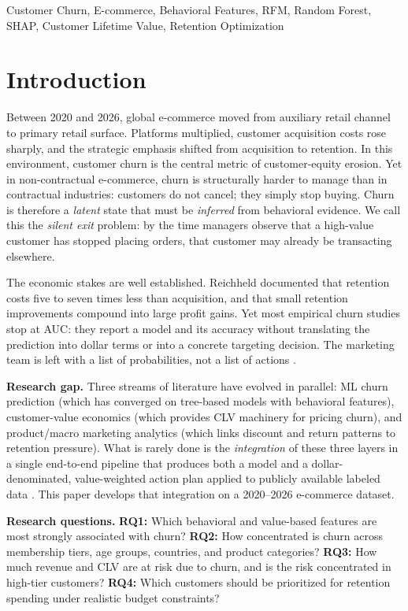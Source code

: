 \documentclass[conference]{IEEEtran}
\begin{document}
\begin{IEEEkeywords}
Customer Churn, E-commerce, Behavioral Features, RFM, Random Forest, SHAP, Customer Lifetime Value, Retention Optimization
\end{IEEEkeywords}

\section{Introduction}

Between 2020 and 2026, global e-commerce moved from auxiliary retail channel to primary retail surface. Platforms multiplied, customer acquisition costs rose sharply, and the strategic emphasis shifted from acquisition to retention. In this environment, customer churn is the central metric of customer-equity erosion. Yet in non-contractual e-commerce, churn is structurally harder to manage than in contractual industries: customers do not cancel; they simply stop buying. Churn is therefore a \emph{latent} state that must be \emph{inferred} from behavioral evidence. We call this the \emph{silent exit} problem: by the time managers observe that a high-value customer has stopped placing orders, that customer may already be transacting elsewhere.

The economic stakes are well established. Reichheld \cite{reichheld2001} documented that retention costs five to seven times less than acquisition, and that small retention improvements compound into large profit gains. Yet most empirical churn studies stop at AUC: they report a model and its accuracy without translating the prediction into dollar terms or into a concrete targeting decision. The marketing team is left with a list of probabilities, not a list of actions \cite{rossler2022,verhoef2010}.

\textbf{Research gap.} Three streams of literature have evolved in parallel: ML churn prediction (which has converged on tree-based models with behavioral features), customer-value economics (which provides CLV machinery for pricing churn), and product/macro marketing analytics (which links discount and return patterns to retention pressure). What is rarely done is the \emph{integration} of these three layers in a single end-to-end pipeline that produces both a model and a dollar-denominated, value-weighted action plan applied to publicly available labeled data \cite{ascarza2018}. This paper develops that integration on a 2020--2026 e-commerce dataset.

\textbf{Research questions.} \textbf{RQ1:} Which behavioral and value-based features are most strongly associated with churn? \textbf{RQ2:} How concentrated is churn across membership tiers, age groups, countries, and product categories? \textbf{RQ3:} How much revenue and CLV are at risk due to churn, and is the risk concentrated in high-tier customers? \textbf{RQ4:} Which customers should be prioritized for retention spending under realistic budget constraints?
\end{document}
